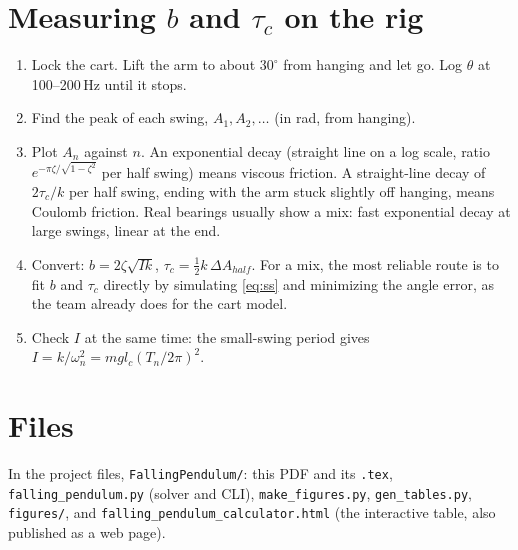 \documentclass[10pt]{article}
\begin{document}
\section{Measuring $b$ and $\tau_c$ on the rig}\label{sec:measure}
\begin{enumerate}
\item Lock the cart. Lift the arm to about $30^\circ$ from hanging and let go. Log $\theta$ at 100--200\,Hz until it stops.
\item Find the peak of each swing, $A_1, A_2, \dots$ (in rad, from hanging).
\item Plot $A_n$ against $n$. An exponential decay (straight line on a log scale, ratio $e^{-\pi\zeta/\sqrt{1-\zeta^2}}$ per half swing) means viscous friction. A straight-line decay of $2\tau_c/k$ per half swing, ending with the arm stuck slightly off hanging, means Coulomb friction. Real bearings usually show a mix: fast exponential decay at large swings, linear at the end.
\item Convert: $b=2\zeta\sqrt{Ik}$, $\tau_c=\tfrac12 k\,\Delta A_{half}$. For a mix, the most reliable route is to fit $b$ and $\tau_c$ directly by simulating \eqref{eq:ss} and minimizing the angle error, as the team already does for the cart model.
\item Check $I$ at the same time: the small-swing period gives $I=k/\omega_n^2=mgl_c(T_n/2\pi)^2$.
\end{enumerate}

\section*{Files}
In the project files, \texttt{FallingPendulum/}: this PDF and its \texttt{.tex}, \texttt{falling\_pendulum.py} (solver and CLI), \texttt{make\_figures.py}, \texttt{gen\_tables.py}, \texttt{figures/}, and \texttt{falling\_pendulum\_calculator.html} (the interactive table, also published as a web page).
\end{document}
